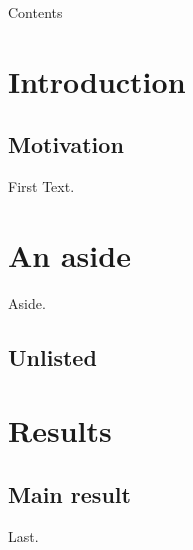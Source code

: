 \documentclass{beamer}
\begin{document}
\begin{frame}{Contents}
\tableofcontents
\end{frame}
\section{Introduction}
\subsection{Motivation}
\begin{frame}{First}
Text.
\end{frame}
\section*{An aside}
\begin{frame}
Aside.
\end{frame}
\subsection*{Unlisted}
\section{Results}
\subsection{Main result}
\begin{frame}
Last.
\end{frame}
\end{document}

